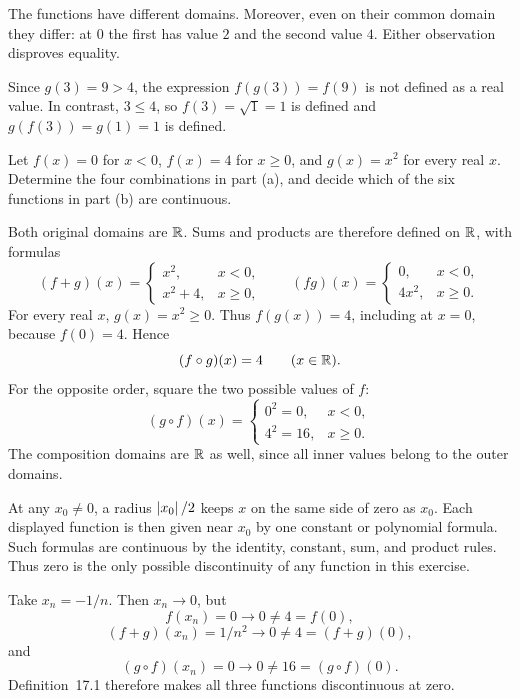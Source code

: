 The functions have different domains. Moreover, even on their
common domain they differ: at $0$ the first has value $2$ and
the second value $4$. Either observation disproves equality.

Since $g(3)=9>4$, the expression $f(g(3))=f(9)$ is not defined
as a real value. In contrast, $3\le4$, so $f(3)=\sqrt1=1$
is defined and $g(f(3))=g(1)=1$ is defined.
\answer{The sum and product domains are $(-\infty,4]$; the two
composition domains are $[-2,2]$ and $(-\infty,4]$.
The compositions are unequal. At $3$, only $g\circ f$ is meaningful.}

\goal Let $f(x)=0$ for $x<0$, $f(x)=4$ for $x\ge0$, and
$g(x)=x^2$ for every real $x$. Determine the four combinations
in part (a), and decide which of the six functions in part (b)
are continuous.

Both original domains are $\mathbb{R}$. Sums and products are therefore
defined on $\mathbb{R}$, with formulas
\[
 (f+g)(x)=\begin{cases}x^2,&x<0,\\x^2+4,&x\ge0,\end{cases}
 \qquad
 (fg)(x)=\begin{cases}0,&x<0,\\4x^2,&x\ge0.\end{cases}
\]
For every real $x$, $g(x)=x^2\ge0$. Thus $f(g(x))=4$,
including at $x=0$, because $f(0)=4$. Hence
\[
 (f\circ g)(x)=4\qquad(x\in\mathbb{R}).
\]
For the opposite order, square the two possible values of $f$:
\[
 (g\circ f)(x)=\begin{cases}0^2=0,&x<0,\\4^2=16,&x\ge0.\end{cases}
\]
The composition domains are $\mathbb{R}$ as well, since all inner
values belong to the outer domains.

At any $x_0\ne0$, a radius $\left|x_0\right|/2$ keeps $x$ on the
same side of zero as $x_0$. Each displayed function is then
given near $x_0$ by one constant or polynomial formula.
Such formulas are continuous by the identity, constant, sum,
and product rules. Thus zero is the only possible discontinuity
of any function in this exercise.

Take $x_n=-1/n$. Then $x_n\to0$, but
\[
 f(x_n)=0\to0\ne4=f(0),
\]
\[
 (f+g)(x_n)=1/n^2\to0\ne4=(f+g)(0),
\]
and
\[
 (g\circ f)(x_n)=0\to0\ne16=(g\circ f)(0).
\]
Definition~17.1 therefore makes all three functions discontinuous
at zero.

